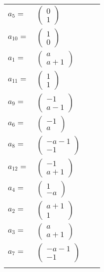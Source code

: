 \documentclass[1p]{elsarticle_modified}
\theoremstyle{definition}
\begin{document}
\begin{tabular}{m{7pt} m{180pt} m{7pt} m{180pt} }
\flushright $a_{5}=$&$\begin{pmatrix}0\\1\end{pmatrix}$ \\
\flushright $a_{10}=$&$\begin{pmatrix}1\\0\end{pmatrix}$ \\
\flushright $a_{1}=$&$\begin{pmatrix}a\\a+1\end{pmatrix}$ \\
\flushright $a_{11}=$&$\begin{pmatrix}1\\1\end{pmatrix}$ \\
\flushright $a_{9}=$&$\begin{pmatrix}-1\\a-1\end{pmatrix}$ \\
\flushright $a_{6}=$&$\begin{pmatrix}-1\\a\end{pmatrix}$ \\
\flushright $a_{8}=$&$\begin{pmatrix}- a-1\\-1\end{pmatrix}$ \\
\flushright $a_{12}=$&$\begin{pmatrix}-1\\a+1\end{pmatrix}$ \\
\flushright $a_{4}=$&$\begin{pmatrix}1\\- a\end{pmatrix}$ \\
\flushright $a_{2}=$&$\begin{pmatrix}a+1\\1\end{pmatrix}$ \\
\flushright $a_{3}=$&$\begin{pmatrix}a\\a+1\end{pmatrix}$ \\
\flushright $a_{7}=$&$\begin{pmatrix}- a-1\\-1\end{pmatrix}$\\&\end{tabular}
\end{document}
